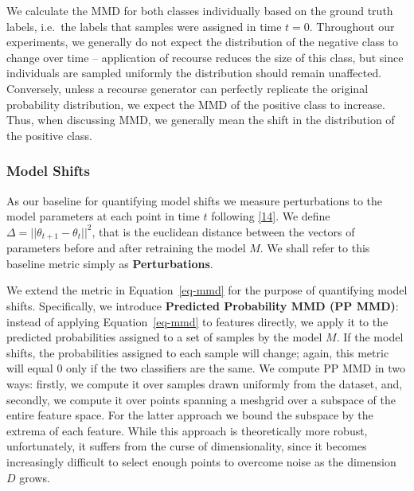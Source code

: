 \documentclass[
  conference]{IEEEtran}
\begin{document}
We calculate the MMD for both classes individually based on the ground
truth labels, i.e.~the labels that samples were assigned in time
\(t=0\). Throughout our experiments, we generally do not expect the
distribution of the negative class to change over time -- application of
recourse reduces the size of this class, but since individuals are
sampled uniformly the distribution should remain unaffected. Conversely,
unless a recourse generator can perfectly replicate the original
probability distribution, we expect the MMD of the positive class to
increase. Thus, when discussing MMD, we generally mean the shift in the
distribution of the positive class.

\hypertarget{model-shifts}{%
\subsubsection{Model Shifts}\label{model-shifts}}

As our baseline for quantifying model shifts we measure perturbations to
the model parameters at each point in time \(t\) following
\protect\hyperlink{ref-upadhyay2021towards}{{[}14{]}}. We define
\(\Delta=||\theta_{t+1}-\theta_{t}||^2\), that is the euclidean distance
between the vectors of parameters before and after retraining the model
\(M\). We shall refer to this baseline metric simply as
\textbf{Perturbations}.

We extend the metric in Equation~\ref{eq-mmd} for the purpose of
quantifying model shifts. Specifically, we introduce \textbf{Predicted
Probability MMD (PP MMD)}: instead of applying Equation~\ref{eq-mmd} to
features directly, we apply it to the predicted probabilities assigned
to a set of samples by the model \(M\). If the model shifts, the
probabilities assigned to each sample will change; again, this metric
will equal 0 only if the two classifiers are the same. We compute PP MMD
in two ways: firstly, we compute it over samples drawn uniformly from
the dataset, and, secondly, we compute it over points spanning a
meshgrid over a subspace of the entire feature space. For the latter
approach we bound the subspace by the extrema of each feature. While
this approach is theoretically more robust, unfortunately, it suffers
from the curse of dimensionality, since it becomes increasingly
difficult to select enough points to overcome noise as the dimension
\(D\) grows.
\end{document}
